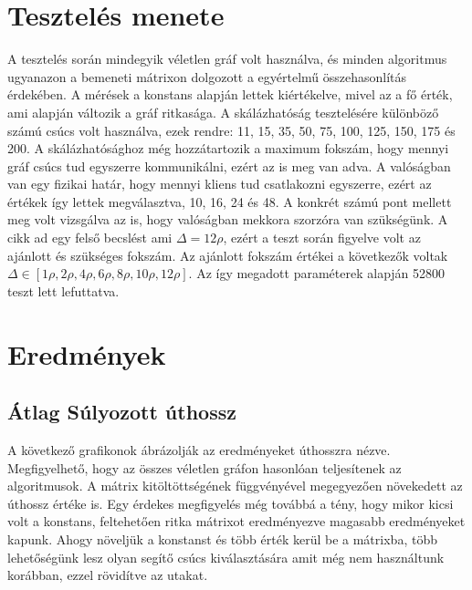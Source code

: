 \documentclass[12pt]{report}
\begin{document}
\section{Tesztelés menete}

A tesztelés során mindegyik véletlen gráf volt használva, és minden algoritmus ugyanazon a bemeneti mátrixon dolgozott a egyértelmű összehasonlítás érdekében. 
A mérések a konstans alapján lettek kiértékelve, mivel az a fő érték, ami alapján változik a gráf ritkasága.
A skálázhatóság tesztelésére különböző számú csúcs volt használva, ezek rendre: 11, 15, 35, 50, 75, 100, 125, 150, 175 és 200.
A skálázhatósághoz még hozzátartozik a maximum fokszám, hogy mennyi gráf csúcs tud egyszerre kommunikálni, ezért az is meg van adva.
A valóságban van egy fizikai határ, hogy mennyi kliens tud csatlakozni egyszerre, ezért az értékek így lettek megválasztva, 10, 16, 24 és 48.
A konkrét számú pont mellett meg volt vizsgálva az is, hogy valóságban mekkora szorzóra van szükségünk. 
A cikk ad egy felső becslést ami $\Delta=12\rho$, ezért a teszt során figyelve volt az ajánlott és szükséges fokszám.
Az ajánlott fokszám értékei a következők voltak $\Delta\in[1\rho, 2\rho, 4\rho, 6\rho, 8\rho, 10\rho, 12\rho]$.
Az így megadott paraméterek alapján 52800 teszt lett lefuttatva.


\section{Eredmények}

\subsection{Átlag Súlyozott úthossz}

A következő grafikonok ábrázolják az eredményeket úthosszra nézve. 
Megfigyelhető, hogy az összes véletlen gráfon hasonlóan teljesítenek az algoritmusok.
A mátrix kitöltöttségének függvényével megegyezően növekedett az úthossz értéke is.
Egy érdekes megfigyelés még továbbá a tény, hogy mikor kicsi volt a konstans, feltehetően ritka mátrixot eredményezve magasabb eredményeket kapunk.
Ahogy növeljük a konstanst és több érték kerül be a mátrixba, több lehetőségünk lesz olyan segítő csúcs kiválasztására amit még nem használtunk korábban, ezzel rövidítve az utakat.
\end{document}
